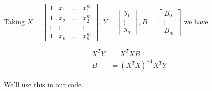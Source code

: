 Taking
$X = \begin{bmatrix}
		1      & x_1    & \dots  & x_1^m  \\
		1      & x_2    & \dots  & x_2^m  \\
		\vdots & \vdots & \vdots & \vdots \\
		1      & x_n    & \dots  & x_n^m
	\end{bmatrix}$,
$Y = \begin{bmatrix}
		y_1 \\ \vdots \\ y_n
	\end{bmatrix}$,
$B = \begin{bmatrix}
		B_0 \\ \vdots \\ B_m
	\end{bmatrix}$
we have

\begin{align}
	X^TY & = X^TXB           \\
	B    & = (X^TX)^{-1}X^TY
\end{align}

We'll use this in our code.
